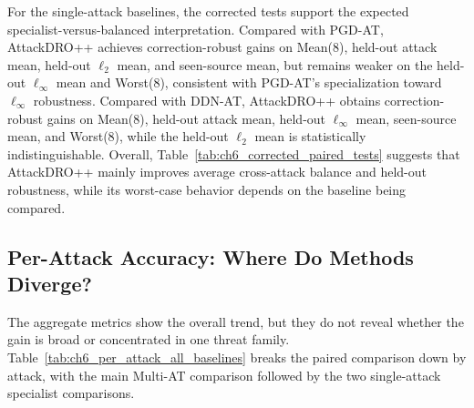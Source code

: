 For the single-attack baselines, the corrected tests support the expected
specialist-versus-balanced interpretation. Compared with PGD-AT, AttackDRO++
achieves correction-robust gains on Mean(8), held-out attack mean, held-out $\ell_2$ mean, and
seen-source mean, but remains weaker on the held-out $\ell_\infty$ mean and Worst(8), consistent
with PGD-AT's specialization toward $\ell_\infty$ robustness. Compared with
DDN-AT, AttackDRO++ obtains correction-robust gains on Mean(8), held-out attack mean,
held-out $\ell_\infty$ mean, seen-source mean, and Worst(8), while the held-out $\ell_2$ mean is
statistically indistinguishable. Overall, Table~\ref{tab:ch6_corrected_paired_tests}
suggests that AttackDRO++ mainly improves average cross-attack balance and
held-out robustness, while its worst-case behavior depends on the baseline being
compared.


\subsection{Per-Attack Accuracy: Where Do Methods Diverge?}
\label{subsec:ch6_per_attack_accuracy}

The aggregate metrics show the overall trend, but they do not reveal whether the gain is
broad or concentrated in one threat family. Table~\ref{tab:ch6_per_attack_all_baselines}
breaks the paired comparison down by attack, with the main Multi-AT comparison followed
by the two single-attack specialist comparisons.


